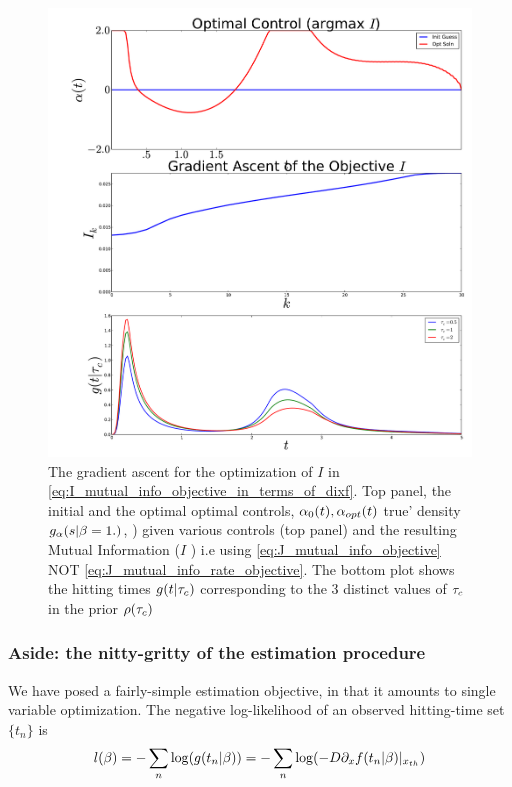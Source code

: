 \begin{figure}[htp] 
\begin{center}
  \includegraphics[width=1\textwidth]{Figs/FP_Adjoint/ExampleOptControl_MI_HT.pdf}
  \caption[labelInTOC]{The gradient ascent for the optimization of $I$ in
  \cref{eq:I_mutual_info_objective_in_terms_of_dixf}. Top panel, the initial and
  the optimal optimal controls, $\alpha_{0}(t), \alpha_{opt}(t)$
   true' density $
  g_{\alpha}(s|\beta = 1.)$, ) given various controls (top panel) and the resulting Mutual Information ($I$ ) i.e using \cref{eq:J_mutual_info_objective} NOT \cref{eq:J_mutual_info_rate_objective}.
  The bottom plot shows the hitting times $g(t| { \tau_{c} })$ corresponding to the 3
  distinct values of ${ \tau_{c} }$ in the prior $\rho({ \tau_{c} })$}
  \label{fig:hitting_time_density_g_aopt_bprior}  
\end{center}
\end{figure} 

\subsubsection{Aside: the nitty-gritty of the estimation procedure}
We have posed a fairly-simple estimation objective, in that it amounts to single
variable optimization. The negative log-likelihood of an observed hitting-time
set $\{t_n\}$ is
\begin{equation}
l(\beta) = - \sum_n \log ( g(t_n | \beta) ) =  - \sum_n \log ( -D {\partial}_x f(t_n |
\beta) |_{{ x_{th} }} )
\end{equation}

